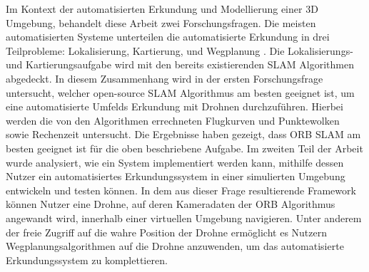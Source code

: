 Im Kontext der automatisierten Erkundung und Modellierung einer 3D Umgebung, behandelt diese Arbeit zwei Forschungsfragen. Die meisten automatisierten Systeme unterteilen die automatisierte Erkundung in drei Teilprobleme: Lokalisierung, Kartierung, und Wegplanung \cite{accurat}. Die Lokalisierungs- und Kartierungsaufgabe wird mit den bereits existierenden SLAM Algorithmen abgedeckt. In diesem Zusammenhang wird in der ersten Forschungsfrage untersucht, welcher open-source SLAM Algorithmus am besten geeignet ist, um eine automatisierte Umfelds Erkundung mit Drohnen durchzuführen. Hierbei werden die von den Algorithmen  errechneten Flugkurven und Punktewolken sowie Rechenzeit untersucht. Die Ergebnisse haben gezeigt, dass ORB SLAM am besten geeignet ist für die oben beschriebene Aufgabe. Im zweiten Teil der Arbeit wurde analysiert, wie ein System implementiert werden kann, mithilfe dessen Nutzer ein automatisiertes Erkundungssystem in einer simulierten Umgebung entwickeln und testen können. In dem aus dieser Frage resultierende Framework können Nutzer eine Drohne, auf deren Kameradaten der ORB Algorithmus angewandt wird, innerhalb einer virtuellen Umgebung navigieren. Unter anderem der freie Zugriff auf die wahre Position der Drohne ermöglicht es Nutzern Wegplanungsalgorithmen auf die Drohne anzuwenden, um das automatisierte Erkundungssystem zu komplettieren.